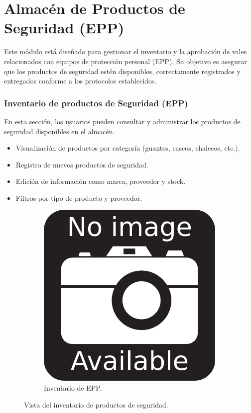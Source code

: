 \chapter{Almacén de Productos de Seguridad (EPP)}

Este módulo está diseñado para gestionar el inventario y la aprobación de vales relacionados con equipos de protección personal (EPP). Su objetivo es asegurar que los productos de seguridad estén disponibles, correctamente registrados y entregados conforme a los protocolos establecidos.

\subsection{Inventario de productos de Seguridad (EPP)}

En esta sección, los usuarios pueden consultar y administrar los productos de seguridad disponibles en el almacén.

\begin{itemize}
    \item Visualización de productos por categoría (guantes, cascos, chalecos, etc.).
    \item Registro de nuevos productos de seguridad.
    \item Edición de información como marca, proveedor y stock.
    \item Filtros por tipo de producto y proveedor.
\end{itemize}

\begin{figure}[h]
\centering
\begin{subfigure}{0.4\textwidth}
    \includegraphics[width=\textwidth]{imgs/no-image.png}
    \caption{Inventario de EPP.}
    \label{fig:epp1}
\end{subfigure}
\caption{Vista del inventario de productos de seguridad.}
\end{figure}

